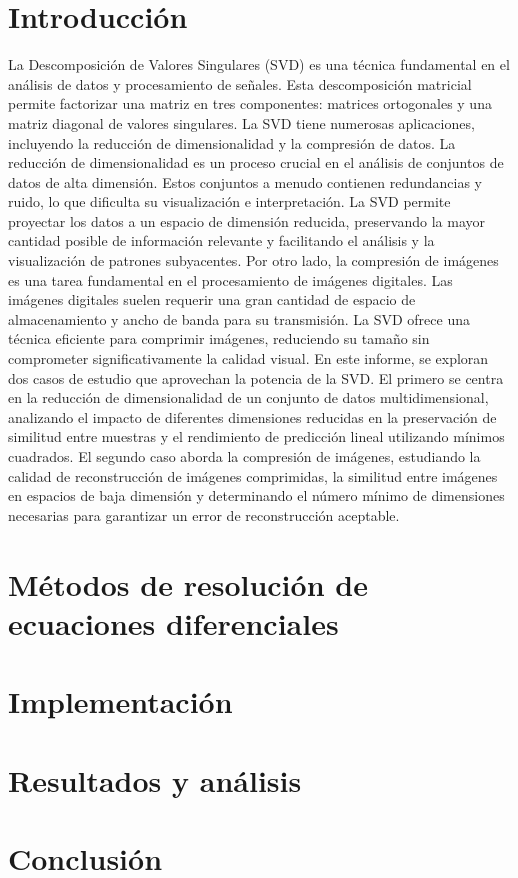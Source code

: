 \documentclass[12pt,a4]{article} %
\begin{document}
\begin{multicols}{2}
\raggedcolumns

\section{Introducción}
La Descomposición de Valores Singulares (SVD) es una técnica fundamental en el análisis de datos y procesamiento de señales. Esta descomposición matricial permite factorizar una matriz en tres componentes: matrices ortogonales y una matriz diagonal de valores singulares. La SVD tiene numerosas aplicaciones, incluyendo la reducción de dimensionalidad y la compresión de datos.
La reducción de dimensionalidad es un proceso crucial en el análisis de conjuntos de datos de alta dimensión. Estos conjuntos a menudo contienen redundancias y ruido, lo que dificulta su visualización e interpretación. La SVD permite proyectar los datos a un espacio de dimensión reducida, preservando la mayor cantidad posible de información relevante y facilitando el análisis y la visualización de patrones subyacentes.
Por otro lado, la compresión de imágenes es una tarea fundamental en el procesamiento de imágenes digitales. Las imágenes digitales suelen requerir una gran cantidad de espacio de almacenamiento y ancho de banda para su transmisión. La SVD ofrece una técnica eficiente para comprimir imágenes, reduciendo su tamaño sin comprometer significativamente la calidad visual.
En este informe, se exploran dos casos de estudio que aprovechan la potencia de la SVD. El primero se centra en la reducción de dimensionalidad de un conjunto de datos multidimensional, analizando el impacto de diferentes dimensiones reducidas en la preservación de similitud entre muestras y el rendimiento de predicción lineal utilizando mínimos cuadrados. El segundo caso aborda la compresión de imágenes, estudiando la calidad de reconstrucción de imágenes comprimidas, la similitud entre imágenes en espacios de baja dimensión y determinando el número mínimo de dimensiones necesarias para garantizar un error de reconstrucción aceptable.
\section{Métodos de resolución de ecuaciones diferenciales}

 
\section{Implementación}


\section{Resultados y análisis}

\section{Conclusión}


\appendix




\end{multicols}

\printbibliography
\end{document}
